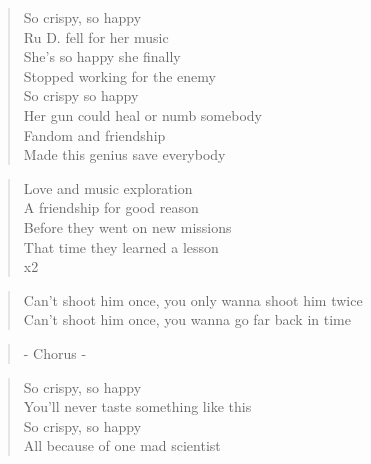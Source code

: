 \begin{verse}
So crispy, so happy\\
Ru D. fell for her music \\
She's so happy she finally\\
Stopped working for the enemy\\
So crispy so happy\\
Her gun could heal or numb somebody\\
Fandom and friendship\\
Made this genius save everybody
\end{verse}

\begin{verse}
Love and music exploration\\
A friendship for good reason\\
Before they went on new missions\\
That time they learned a lesson\\
x2
\end{verse}

\begin{verse}
Can't shoot him once, you only wanna shoot him twice\\
Can't shoot him once, you wanna go far back in time
\end{verse}

\begin{verse}
- Chorus -
\end{verse}

\begin{verse}
So crispy, so happy\\
You'll never taste something like this\\
So crispy, so happy\\
All because of one mad scientist
\end{verse}

\clearpage
